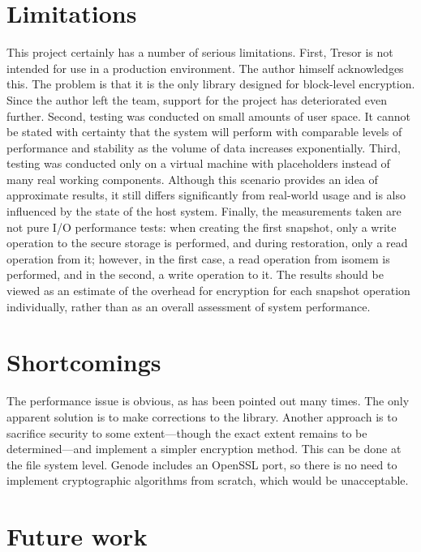 \section{Limitations}

This project certainly has a number of serious limitations. First, Tresor is not intended for use in a production environment. The author himself acknowledges this. The problem is that it is the only library designed for block-level encryption. Since the author left the team, support for the project has deteriorated even further. Second, testing was conducted on small amounts of user space. It cannot be stated with certainty that the system will perform with comparable levels of performance and stability as the volume of data increases exponentially. Third, testing was conducted only on a virtual machine with placeholders instead of many real working components. Although this scenario provides an idea of approximate results, it still differs significantly from real-world usage and is also influenced by the state of the host system. Finally, the measurements taken are not pure I/O performance tests: when creating the first snapshot, only a write operation to the secure storage is performed, and during restoration, only a read operation from it; however, in the first case, a read operation from isomem is performed, and in the second, a write operation to it. The results should be viewed as an estimate of the overhead for encryption for each snapshot operation individually, rather than as an overall assessment of system performance.

\section{Shortcomings}

The performance issue is obvious, as has been pointed out many times. The only apparent solution is to make corrections to the library. Another approach is to sacrifice security to some extent—though the exact extent remains to be determined—and implement a simpler encryption method. This can be done at the file system level. Genode includes an OpenSSL port, so there is no need to implement cryptographic algorithms from scratch, which would be unacceptable.

\section{Future work}

